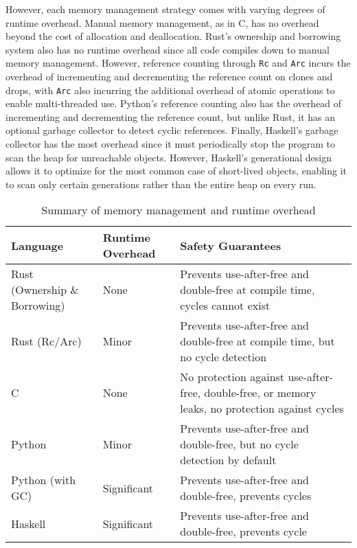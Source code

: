 \documentclass[12pt, letterpaper]{article}
\begin{document}
However, each memory management strategy comes with varying degrees of runtime overhead. Manual memory management, as in C, has no overhead beyond the cost of allocation and deallocation. Rust's ownership and borrowing system also has no runtime overhead since all code compiles down to manual memory management. However, reference counting through \texttt{Rc} and \texttt{Arc} incurs the overhead of incrementing and decrementing the reference count on clones and drops, with \texttt{Arc} also incurring the additional overhead of atomic operations to enable multi-threaded use. Python's reference counting also has the overhead of incrementing and decrementing the reference count, but unlike Rust, it has an optional garbage collector to detect cyclic references. Finally, Haskell's garbage collector has the most overhead since it must periodically stop the program to scan the heap for unreachable objects. However, Haskell's generational design allows it to optimize for the most common case of short-lived objects, enabling it to scan only certain generations rather than the entire heap on every run.
\begin{table}[H]
	\centering
	\begin{tabular}{p{3cm}|p{2cm}|p{6cm}}
		Language                      & Runtime Overhead & Safety Guarantees                                                                                \\
		\hline
		Rust (Ownership \& Borrowing) & None             & Prevents use-after-free and double-free at compile time, cycles cannot exist                     \\
		\hline
		Rust (Rc/Arc)                 & Minor            & Prevents use-after-free and double-free at compile time, but no cycle detection                  \\
		\hline
		C                             & None             & No protection against use-after-free, double-free, or memory leaks, no protection against cycles \\
		\hline
		Python                        & Minor            & Prevents use-after-free and double-free, but no cycle detection by default                       \\
		\hline
		Python (with GC)              & Significant      & Prevents use-after-free and double-free, prevents cycles                                         \\
		\hline
		Haskell                       & Significant      & Prevents use-after-free and double-free, prevents cycle                                          \\
	\end{tabular}
	\caption{Summary of memory management and runtime overhead}
\end{table}
\end{document}
